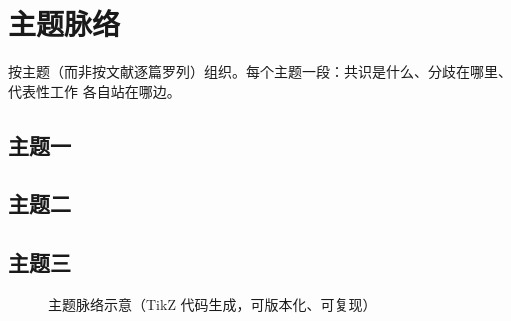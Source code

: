 \section{主题脉络}
\label{sec:themes}

按主题（而非按文献逐篇罗列）组织。每个主题一段：共识是什么、分歧在哪里、
代表性工作 \parencite{example2026} 各自站在哪边。

\subsection{主题一}
\subsection{主题二}
\subsection{主题三}

\begin{figure}[htbp]
  \centering
  
  \caption{主题脉络示意（TikZ 代码生成，可版本化、可复现）}
  \label{fig:theme-map}
\end{figure}
